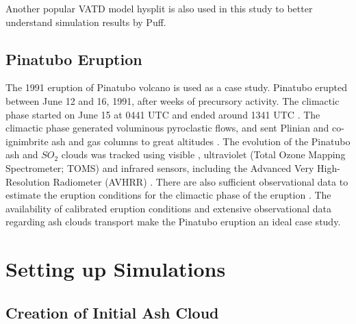 \documentclass[draft,linenumbers]{agujournal2019}
\begin{document}
Another popular VATD model hysplit \citep{stein2015noaa, rolph2017real} is also used in this study to better understand simulation results by Puff. 

\subsection{Pinatubo Eruption}

The 1991 eruption of Pinatubo volcano is used as a case study.  Pinatubo erupted between June 12 and 16, 1991, after weeks of precursory activity. The climactic phase started on June 15 at 0441 UTC and ended around 1341 UTC \citep{holasek1996satellite}. The climactic phase generated voluminous pyroclastic flows, and sent Plinian and co-ignimbrite ash and gas columns to great altitudes \citep{scott1996pyroclastic}. The evolution of the Pinatubo ash and $SO_2$ clouds was tracked using visible \citep{holasek1996satellite}, ultraviolet (Total Ozone Mapping Spectrometer; TOMS) \citep{guo2004re} and infrared sensors, including the Advanced Very High-Resolution Radiometer (AVHRR) \citep{guo2004particles}. There are also sufficient observational data to estimate the eruption conditions for the climactic phase of the eruption \citep{suzuki2009three}. The availability of calibrated eruption conditions and extensive observational data regarding ash clouds transport make the Pinatubo eruption an ideal case study.

\section{Setting up Simulations} \label{sec:Methodology}

\subsection{Creation of Initial Ash Cloud} \label{sec:create-initial-condition}
\end{document}
